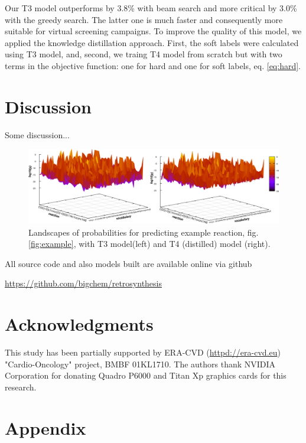 \documentclass{article}
\begin{document}
Our T3 model outperforms \cite{Pande} by 3.8\% with beam search and more critical by 3.0\% with the greedy search. The latter one is much faster and consequently more suitable for virtual screening campaigns. To improve the quality of this model, we applied the knowledge distillation approach. First, the soft labels were calculated using T3 model, and, second, we traing T4 model from scratch but with two terms in the objective function: one for hard and one for soft labels, eq. \ref{eq:hard}. 


\section{Discussion}

Some discussion...

\begin{figure}
  \centering
  \includegraphics[width = 16.5cm]{images/probland.pdf}
  \caption{Landscapes of probabilities for predicting example reaction, fig. \ref{fig:example}, with  T3 model(left) and T4 (distilled) model (right). }
  \label{fig:landscape}
\end{figure}

All source code and also models built are available online via github
\begin{center}
  \url{https://github.com/bigchem/retrosynthesis}
\end{center}

\section*{Acknowledgments}
This study has been partially supported by ERA-CVD (\url{httpd://era-cvd.eu}) "Cardio-Oncology" project, BMBF 01KL1710.
The authors thank NVIDIA Corporation for donating Quadro P6000 and Titan Xp graphics cards for this research.

  

 
 \newpage
 
\section*{Appendix}
\end{document}
